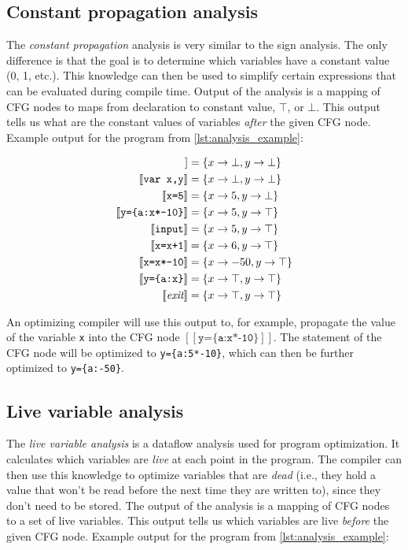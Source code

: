 \documentclass[thesis=M,english]{FITthesis}[2019/12/23]
\begin{document}
\subsection{Constant propagation analysis}\label{ssec:constant_prop_analysis}
The \emph{constant propagation} analysis is very similar to the sign analysis. The only difference is that the goal is to determine which variables have a constant value (0, 1, etc.). This knowledge can then be used to simplify certain expressions that can be evaluated during compile time. Output of the analysis is a mapping of CFG nodes to maps from declaration to constant value, $\top$, or $\bot$. This output tells us what are the constant values of variables \emph{after} the given CFG node. Example output for the program from \autoref{lst:analysis_example}:

\begin{align*}
    [\![ \emph{entry} ]\!] &= \{ x \rightarrow \bot, y \rightarrow \bot \}\\
    [\![ \texttt{var x,y} ]\!] &= \{ x \rightarrow \bot, y \rightarrow \bot \}\\
    [\![ \texttt{x=5} ]\!] &= \{ x \rightarrow 5, y \rightarrow \bot \}\\
    [\![ \texttt{y=\{a:x*-10\}} ]\!] &= \{ x \rightarrow 5, y \rightarrow \top \}\\
    [\![ \texttt{input} ]\!] &= \{ x \rightarrow 5, y \rightarrow \top \}\\
    [\![ \texttt{x=x+1} ]\!] &= \{ x \rightarrow 6, y \rightarrow \top \}\\
    [\![ \texttt{x=x*-10} ]\!] &= \{ x \rightarrow -50, y \rightarrow \top \}\\
    [\![ \texttt{y=\{a:x\}} ]\!] &= \{ x \rightarrow \top, y \rightarrow \top \}\\
    [\![ \emph{exit} ]\!] &= \{ x \rightarrow \top, y \rightarrow \top \}
\end{align*}

An optimizing compiler will use this output to, for example, propagate the value of the variable \texttt{x} into the CFG node $[\![ \texttt{y=\{a:x*-10\}} ]\!]$. The statement of the CFG node will be optimized to \texttt{y=\{a:5*-10\}}, which can then be further optimized to \texttt{y=\{a:-50\}}.

\subsection{Live variable analysis}\label{ssec:live_var_analysis}
The \emph{live variable analysis} is a dataflow analysis used for program optimization. It calculates which variables are \emph{live} at each point in the program. The compiler can then use this knowledge to optimize variables that are \emph{dead} (i.e., they hold a value that won't be read before the next time they are written to), since they don't need to be stored. The output of the analysis is a mapping of CFG nodes to a set of live variables. This output tells us which variables are live \emph{before} the given CFG node. Example output for the program from \autoref{lst:analysis_example}:
\end{document}
